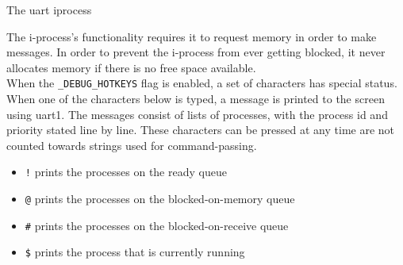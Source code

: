 \documentclass[12pt]{report}
\begin{document}
\begin{algorithm}
  \caption{The uart iprocess}
  \begin{algorithmic}[1]
				\State {}
			\EndIf
			\EndIf

				\EndIf
			\Else
			\EndIf

			\State {}
		\EndIf
    \EndProcedure
  \end{algorithmic}
\end{algorithm}

The i-process's functionality requires it to request memory in order to make messages. In order to prevent the i-process from ever getting blocked, it never allocates memory if there is no free space available.\\

When the {\tt \_DEBUG\_HOTKEYS} flag is enabled, a set of characters has special status. When one of the characters below is typed, a message is printed to the screen using uart1. The messages consist of lists of processes, with the process id and priority stated line by line. These characters can be pressed at any time are not counted towards strings used for command-passing.\\

\begin{itemize}

\item {\tt !} prints the processes on the ready queue\\
\item {\tt @} prints the processes on the blocked-on-memory queue\\
\item {\tt \#} prints the processes on the blocked-on-receive queue\\
\item {\tt \$} prints the process that is currently running\\

\end{itemize}
\end{document}
